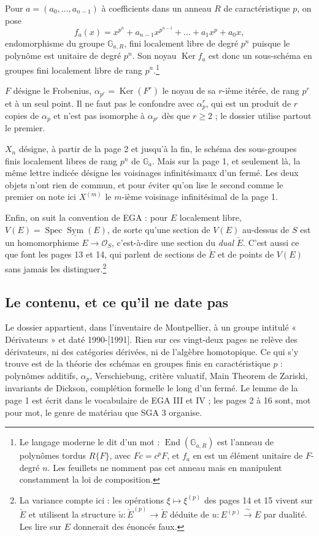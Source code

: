 \documentclass[11pt,a4paper]{article}
\begin{document}
Pour $a = (a_0, \dots, a_{n-1})$ à coefficients dans un anneau $R$ de
caractéristique $p$, on pose
\[
  f_a(x) = x^{p^n} + a_{n-1}x^{p^{n-1}} + \dots + a_1 x^p + a_0 x ,
\]
endomorphisme du groupe $\mathbb{G}_{a,R}$, fini localement libre de degré
$p^n$ puisque le polynôme est unitaire de degré $p^n$. Son noyau
$\operatorname{Ker} f_a$ est donc un sous-schéma en groupes fini localement
libre de rang $p^n$.\footnote{Le langage moderne le dit d'un mot :
$\operatorname{End}(\mathbb{G}_{a,R})$ est l'anneau de polynômes tordus
$R\{F\}$, avec $F c = c^p F$, et $f_a$ en est un élément unitaire de
$F$-degré $n$. Les feuillets ne nomment pas cet anneau mais en manipulent
constamment la loi de composition.}

$F$ désigne le Frobenius, $\alpha_{p^r} = \operatorname{Ker}(F^r)$ le noyau
de sa $r$-ième itérée, de rang $p^r$ et à un seul point. Il ne faut pas le
confondre avec $\alpha_p^r$, qui est un produit de $r$ copies de $\alpha_p$
et n'est pas isomorphe à $\alpha_{p^r}$ dès que $r \geqslant 2$ ; le dossier
utilise partout le premier.

$X_n$ désigne, à partir de la page 2 et jusqu'à la fin, le schéma des
sous-groupes finis localement libres de rang $p^n$ de $\mathbb{G}_a$. Mais
sur la page 1, et seulement là, la même lettre indicée désigne les
voisinages infinitésimaux d'un fermé. Les deux objets n'ont rien de commun,
et pour éviter qu'on lise le second comme le premier on note ici $X^{(m)}$
le $m$-ième voisinage infinitésimal de la page 1.

Enfin, on suit la convention de EGA : pour $E$ localement libre,
$V(E) = \operatorname{Spec} \underline{\operatorname{Sym}}(E)$, de sorte
qu'une section de $V(E)$ au-dessus de $S$ est un homomorphisme
$E \to \mathcal{O}_S$, c'est-à-dire une section du \emph{dual}
$\check{E}$. C'est aussi ce que font les pages 13 et 14, qui parlent de
sections de $\check{E}$ et de points de $V(E)$ sans jamais les
distinguer.\footnote{La variance compte ici : les
opérations $\xi \mapsto \xi^{(p)}$ des pages 14 et 15 vivent sur $\check{E}$
et utilisent la structure $\check{u} : \check{E}^{(p)} \to \check{E}$
déduite de $u : E^{(p)} \xrightarrow{\ \sim\ } E$ par dualité. Les lire sur
$E$ donnerait des énoncés faux.}

\subsection*{Le contenu, et ce qu'il ne date pas}

Le dossier appartient, dans
l'inventaire de Montpellier, à un groupe intitulé « Dérivateurs » et daté
1990-[1991]. Rien sur ces vingt-deux pages ne relève des dérivateurs, ni des
catégories dérivées, ni de l'algèbre homotopique. Ce qui s'y trouve est de
la théorie des schémas en groupes finis en caractéristique $p$ : polynômes
additifs, $\alpha_p$, Verschiebung, critère valuatif, Main Theorem de
Zariski, invariants de Dickson, complétion formelle le long d'un fermé. Le
lemme de la page 1 est écrit dans le vocabulaire de EGA III et IV ; les
pages 2 à 16 sont, mot pour mot, le genre de matériau que SGA 3 organise.
\end{document}
